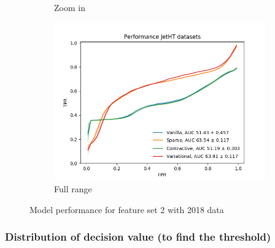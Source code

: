 \begin{figure}[h!]
\begin{subfigure}[b]{0.49\linewidth}
        \caption{Zoom in}
    \end{subfigure}
    \begin{subfigure}[b]{0.49\linewidth}
        \includegraphics[width=\linewidth]{images/reco/2018/feature_2/performance_JetHT_VanillaSparseContractiveVariational.png}
        \caption{Full range}
    \end{subfigure}
    \caption{Model performance for feature set 2 with 2018 data}
\label{fig:2018_f2_ae_performance}
\end{figure}

\subsubsection{Distribution of decision value (to find the threshold)}

